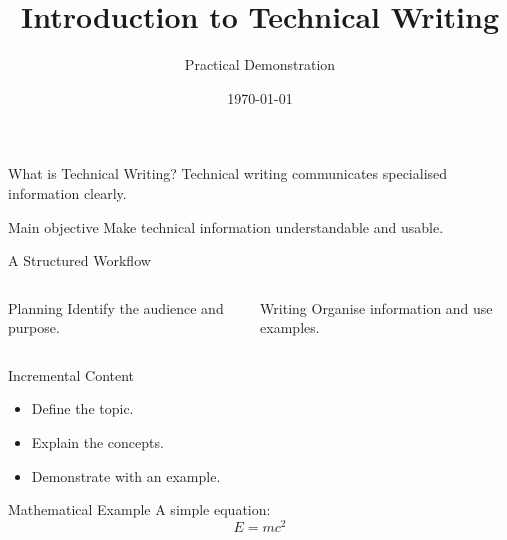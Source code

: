 \documentclass{beamer}
\title{Introduction to Technical Writing}
\author{Practical Demonstration}
\institute{Technical Writing}
\date{\today}
\begin{document}
\begin{frame}
  \titlepage
\end{frame}

\begin{frame}{What is Technical Writing?}
  Technical writing communicates specialised information clearly.
  \begin{block}{Main objective}
    Make technical information understandable and usable.
  \end{block}
\end{frame}

\begin{frame}{A Structured Workflow}
  \begin{columns}[T]
      \begin{block}{Planning}
        Identify the audience and purpose.
      \end{block}
      \begin{block}{Writing}
        Organise information and use examples.
      \end{block}
  \end{columns}
\end{frame}

\begin{frame}{Incremental Content}
  \begin{itemize}
    \item<1-> Define the topic.
    \item<2-> Explain the concepts.
    \item<3-> Demonstrate with an example.
  \end{itemize}
\end{frame}

\begin{frame}{Mathematical Example}
  A simple equation:
  \[
    E = mc^2
  \]
\end{frame}
\end{document}
